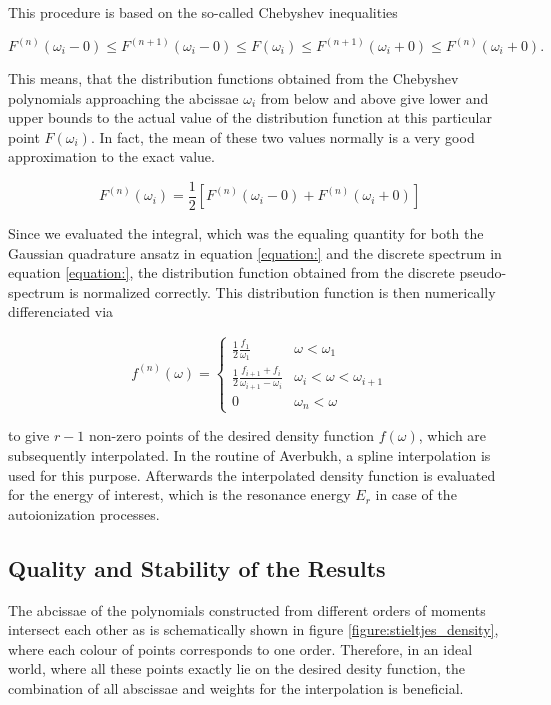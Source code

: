This procedure is based on the so-called Chebyshev inequalities

\begin{equation} \label{equation:Chebyshev_inequalities}
  F^{(n)}(\omega_i - 0) \le F^{(n+1)}(\omega_i - 0) \le F(\omega_i)
  \le F^{(n+1)}(\omega_i + 0) \le F^{(n)}(\omega_i + 0).
\end{equation}

This means, that the distribution functions obtained from the Chebyshev
polynomials approaching the abcissae $\omega_i$ from below and above
give lower and upper bounds to the actual value of the distribution
function at this particular point $F(\omega_i)$. In fact, the mean of these
two values normally is a very good approximation to the exact value.

\begin{equation}
  F^{(n)} (\omega_i) = \frac 12 \left[ F^{(n)} (\omega_i - 0)
                       + F^{(n)} (\omega_i+0) \right]
\end{equation}

Since we evaluated the integral,
which was the equaling quantity for both the Gaussian quadrature ansatz
in equation \ref{equation:} and the discrete spectrum in equation
\ref{equation:}, the distribution function obtained from the
discrete pseudo-spectrum is normalized correctly.
This distribution function is then numerically differenciated via

\begin{equation}
  f^{(n)} (\omega) =
  \begin{cases}
    \frac 12 \frac{f_1}{\omega_1}    & \omega < \omega_1\\
    \frac 12 \frac{f_{i+1} + f_i}{\omega_{i+1} - \omega_i}
                                     & \omega_i < \omega < \omega_{i+1}\\
    0                                & \omega_n < \omega
  \end{cases}
\end{equation}

to give  $r-1$ non-zero points of the desired
density function $f(\omega)$, which are
subsequently interpolated. In the routine of Averbukh, a spline interpolation
is used for this purpose. Afterwards the interpolated density function is evaluated
for the energy of interest, which is the resonance energy $E_r$ in case of the
autoionization processes.

\subsection{Quality and Stability of the Results} \label{section:quality_stieltjes}
The abcissae of the polynomials constructed from different orders
of moments intersect each other as is schematically shown in
figure \ref{figure:stieltjes_density}, where each colour of points corresponds
to one order. Therefore, in an ideal world, where all these points exactly lie
on the desired desity function, the combination of all abscissae
and weights for the interpolation is beneficial.

